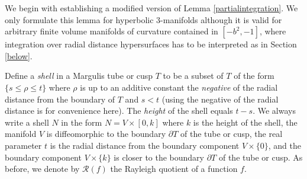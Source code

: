\documentclass[11pt]{amsart}
\theoremstyle{plain}
\theoremstyle{plain}
\theoremstyle{definition}
\newcommand{\cal}{\mathcal}
\begin{document}
We begin with establishing 
a modified version of Lemma \ref{partialintegration}.
We only formulate this lemma for hyperbolic 3-manifolds although it 
is valid for arbitrary finite volume manifolds of curvature contained in 
$[-b^2,-1]$, where integration over radial distance hypersurfaces has to be
interpreted as in Section \ref{below}. 

Define a \emph{shell}
in a Margulis tube or cusp $T$ to be a subset of $T$ of the form
$\{s\leq \rho\leq t\}$ where $\rho$ is up to an additive  
constant the \emph{negative} of the
radial distance from the boundary of $T$
and $s<t$ (using the negative of the radial distance is for convenience here). 
The \emph{height} of the shell equals $t-s$. 
We always write a shell $N$ in the form $N=V\times [0,k]$ where
$k$ is the height of the shell, the manifold
$V$ is diffeomorphic to the boundary 
$\partial T$ of the tube or cusp, 
the real parameter $t$ is the radial distance
from the boundary component $V\times \{0\}$, and 
the boundary component $V\times \{k\}$ is closer to the boundary $\partial T$ of the tube or cusp. 
As before, we denote by ${\cal R}(f)$ the Rayleigh quotient of a function $f$.
\end{document}
